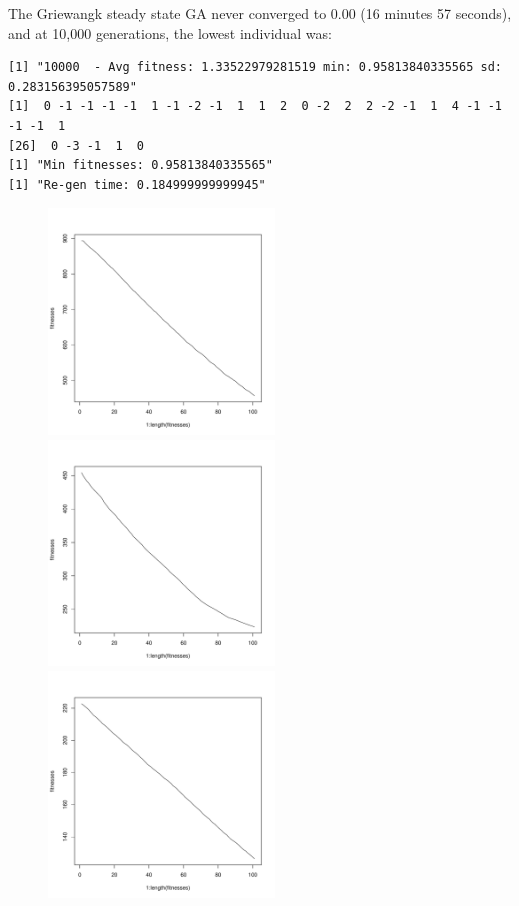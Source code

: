 \documentclass[12pt]{article}
\begin{document}
The Griewangk steady state GA never converged to 0.00 (16 minutes 57 seconds), and at 10,000 generations, the lowest individual was:
\scriptsize
\begin{lstlisting}
[1] "10000  - Avg fitness: 1.33522979281519 min: 0.95813840335565 sd: 0.283156395057589"
[1]  0 -1 -1 -1 -1  1 -1 -2 -1  1  1  2  0 -2  2  2 -2 -1  1  4 -1 -1 -1 -1  1
[26]  0 -3 -1  1  0
[1] "Min fitnesses: 0.95813840335565"
[1] "Re-gen time: 0.184999999999945"
\end{lstlisting}
\normalsize

\pagebreak

\begin{figure}[!h]
        \begin{center}
		\includegraphics[width=60mm]{images/griewangk.ss/avg_101.pdf}
		\includegraphics[width=60mm]{images/griewangk.ss/avg_202.pdf}
		\includegraphics[width=60mm]{images/griewangk.ss/avg_303.pdf}

\end{center}
\end{figure}
\end{document}

